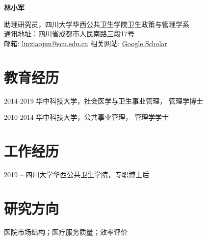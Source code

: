 \documentclass[12pt,letterpaper]{report}
\newcommand{\myname}{林小军}
\newcommand{\namefont}[1]{{\normalfont\bfseries\Huge{#1}}}
\newcommand{\listitemspace}{0.15em}
\renewenvironment{itemize}
{\begin{list}{}{\setlength{\leftmargin}{0em}
            \setlength{\parskip}{0em}
            \setlength{\itemsep}{\listitemspace}
            \setlength{\parsep}{\listitemspace}}}
    {\end{list}}
\begin{document}
    \raggedright

    \namefont{\myname}

    \vspace{1em}
    \begin{minipage}[t]{0.68\textwidth}
    	助理研究员，四川大学华西公共卫生学院卫生政策与管理学系\\
        通讯地址：{四川省成都市人民南路三段17号} \\
        邮箱: \href{mailto:linxiaojun@scu.edu.cn}{linxiaojun@scu.edu.cn}  \space  相关网站: \href{https://scholar.google.com/citations?user=ZBGYTowAAAAJ&hl=en}{Google Scholar}
    \end{minipage}
    
    \vspace{0.3em}


    \section*{教育经历}

    \begin{tablist}
        \item[2014-2019] \tab 华中科技大学，社会医学与卫生事业管理， 管理学博士
        
        \item[2010-2014] \tab 华中科技大学，公共事业管理， 管理学学士
    \end{tablist}


    \section*{工作经历}

    \begin{tablist}

        \item[2019 -- ]   \tab 四川大学华西公共卫生学院，专职博士后                       

    \end{tablist}



    \section*{研究方向 }

    \begin{itemize}

        \item 医院市场结构；医疗服务质量；效率评价

    \end{itemize}
\end{document}
